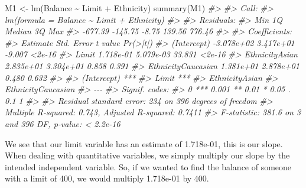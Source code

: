 \documentclass[
]{book}
\newenvironment{Shaded}{\begin{snugshade}}{\end{snugshade}}
\newcommand{\CommentTok}[1]{\textcolor[rgb]{0.56,0.35,0.01}{\textit{#1}}}
\newcommand{\FunctionTok}[1]{\textcolor[rgb]{0.00,0.00,0.00}{#1}}
\newcommand{\NormalTok}[1]{#1}
\newcommand{\OtherTok}[1]{\textcolor[rgb]{0.56,0.35,0.01}{#1}}
\newcommand{\SpecialCharTok}[1]{\textcolor[rgb]{0.00,0.00,0.00}{#1}}
\begin{document}
\begin{Shaded}
\begin{Highlighting}[]
\NormalTok{M1 }\OtherTok{\textless{}{-}} \FunctionTok{lm}\NormalTok{(Balance }\SpecialCharTok{\textasciitilde{}}\NormalTok{ Limit }\SpecialCharTok{+}\NormalTok{ Ethnicity)}
\FunctionTok{summary}\NormalTok{(M1)}
\CommentTok{\#\textgreater{} }
\CommentTok{\#\textgreater{} Call:}
\CommentTok{\#\textgreater{} lm(formula = Balance \textasciitilde{} Limit + Ethnicity)}
\CommentTok{\#\textgreater{} }
\CommentTok{\#\textgreater{} Residuals:}
\CommentTok{\#\textgreater{}     Min      1Q  Median      3Q     Max }
\CommentTok{\#\textgreater{} {-}677.39 {-}145.75   {-}8.75  139.56  776.46 }
\CommentTok{\#\textgreater{} }
\CommentTok{\#\textgreater{} Coefficients:}
\CommentTok{\#\textgreater{}                      Estimate Std. Error t value Pr(\textgreater{}|t|)}
\CommentTok{\#\textgreater{} (Intercept)        {-}3.078e+02  3.417e+01  {-}9.007   \textless{}2e{-}16}
\CommentTok{\#\textgreater{} Limit               1.718e{-}01  5.079e{-}03  33.831   \textless{}2e{-}16}
\CommentTok{\#\textgreater{} EthnicityAsian      2.835e+01  3.304e+01   0.858    0.391}
\CommentTok{\#\textgreater{} EthnicityCaucasian  1.381e+01  2.878e+01   0.480    0.632}
\CommentTok{\#\textgreater{}                       }
\CommentTok{\#\textgreater{} (Intercept)        ***}
\CommentTok{\#\textgreater{} Limit              ***}
\CommentTok{\#\textgreater{} EthnicityAsian        }
\CommentTok{\#\textgreater{} EthnicityCaucasian    }
\CommentTok{\#\textgreater{} {-}{-}{-}}
\CommentTok{\#\textgreater{} Signif. codes:  }
\CommentTok{\#\textgreater{} 0 \textquotesingle{}***\textquotesingle{} 0.001 \textquotesingle{}**\textquotesingle{} 0.01 \textquotesingle{}*\textquotesingle{} 0.05 \textquotesingle{}.\textquotesingle{} 0.1 \textquotesingle{} \textquotesingle{} 1}
\CommentTok{\#\textgreater{} }
\CommentTok{\#\textgreater{} Residual standard error: 234 on 396 degrees of freedom}
\CommentTok{\#\textgreater{} Multiple R{-}squared:  0.743,  Adjusted R{-}squared:  0.7411 }
\CommentTok{\#\textgreater{} F{-}statistic: 381.6 on 3 and 396 DF,  p{-}value: \textless{} 2.2e{-}16}
\end{Highlighting}
\end{Shaded}

We see that our limit variable has an estimate of 1.718e-01, this is our slope. When dealing with quantitative variables, we simply multiply our slope by the intended independent variable. So, if we wanted to find the balance of someone with a limit of 400, we would multiply 1.718e-01 by 400.
\end{document}
